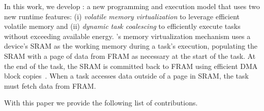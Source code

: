 In this work, we develop \sys: a new programming and execution model that uses two new runtime features: (i) {\em volatile memory virtualization} to leverage efficient volatile memory and (ii) {\em dynamic task coalescing} to efficiently execute tasks without exceeding available energy. \sys's memory virtualization mechanism uses a device's SRAM as the working memory during a task's execution, populating the SRAM with a page of data from FRAM as necessary at the start of the task. At the end of the task, the SRAM is committed back to FRAM using efficient DMA block copies~\cite{kistler_micro_2006}. When a task accesses data outside of a page in SRAM, the task must fetch data from FRAM. 


With this paper we provide the following list of contributions.

